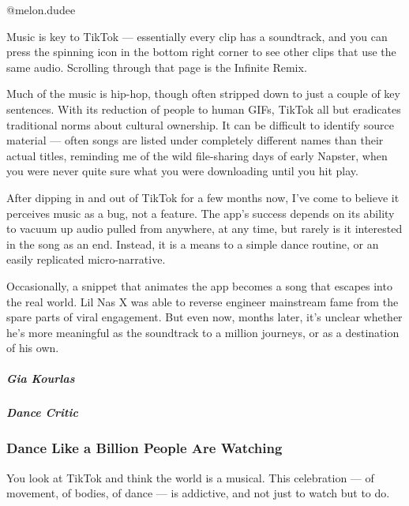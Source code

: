 \href{https://www.tiktok.com/@melon.dudee/video/6740756154743360774?u_code=cm1d04c8g06e8k\&preview_pb=0\&language=en\&timestamp=1570133566\&utm_campaign=client_share\&app=musically\&utm_medium=ios\&user_id=6532049790534942722\&tt_from=copy\&utm_source=copy\&enter_from=h5_m}{}

@melon.dudee

Music is key to TikTok --- essentially every clip has a soundtrack, and
you can press the spinning icon in the bottom right corner to see other
clips that use the same audio. Scrolling through that page is the
Infinite Remix.

Much of the music is hip-hop, though often stripped down to just a
couple of key sentences. With its reduction of people to human GIFs,
TikTok all but eradicates traditional norms about cultural ownership. It
can be difficult to identify source material --- often songs are listed
under completely different names than their actual titles, reminding me
of the wild file-sharing days of early Napster, when you were never
quite sure what you were downloading until you hit play.

After dipping in and out of TikTok for a few months now, I've come to
believe it perceives music as a bug, not a feature. The app's success
depends on its ability to vacuum up audio pulled from anywhere, at any
time, but rarely is it interested in the song as an end. Instead, it is
a means to a simple dance routine, or an easily replicated
micro-narrative.

Occasionally, a snippet that animates the app becomes a song that
escapes into the real world. Lil Nas X was able to reverse engineer
mainstream fame from the spare parts of viral engagement. But even now,
months later, it's unclear whether he's more meaningful as the
soundtrack to a million journeys, or as a destination of his own.

\hypertarget{gia-kourlas-1}{%
\subparagraph{Gia Kourlas}\label{gia-kourlas-1}}

\hypertarget{dance-critic}{%
\subparagraph{Dance Critic}\label{dance-critic}}

\hypertarget{dance-like-a-billion-people-are-watching}{%
\subsubsection{Dance Like a Billion People Are
Watching}\label{dance-like-a-billion-people-are-watching}}

You look at TikTok and think the world is a musical. This celebration
--- of movement, of bodies, of dance --- is addictive, and not just to
watch but to do.

